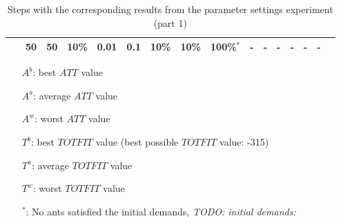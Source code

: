 \begin{sidewaystable}
\begin{tabular}{|l|l|l|l|l|l|l|l|l|l||c|c|c|c|c|c|}
    ~ & 50 & 50 & 10\% & 0.01 & 0.1 & 10\% & 10\% & \textbf{100\%$^*$} & - & - & - & - & - & - \\
    \hline
    \end{tabular}
    \caption {Steps with the corresponding results from the parameter settings experiment (part 1)}
    \tiny
    \begin{itemize}[noitemsep]
    \item[$A^b$:] best $ATT$ value
    \item[$A^a$:] average $ATT$ value
    \item[$A^w$:] worst $ATT$ value
    \item[$T^b$:] best $TOTFIT$ value (best possible $TOTFIT$ value: -315)
    \item[$T^a$:] average $TOTFIT$ value
    \item[$T^w$:] worst $TOTFIT$ value
    \item[$^*$:] No ants satisfied the initial demands, \emph{\color{blue} TODO: initial demands: }
    \end{itemize}
    \label{table:pm1}
\end{sidewaystable}

